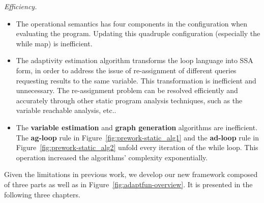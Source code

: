  \emph{Efficiency.}
 \begin{itemize}
    \item The operational semantics has four components in the configuration when evaluating the program. 
    Updating this quadruple configuration (especially the while map) is inefficient.   
    \item
    The adaptivity estimation algorithm transforms the loop language into SSA form, in order to address the issue of re-assignment of different queries requesting results to the same variable.
    This transformation is inefficient and unnecessary.
    The re-assignment problem can be resolved efficiently and accurately through other static program analysis techniques, such as the
    variable reachable analysis, etc..
    \item The \textbf{variable estimation} and \textbf{graph generation} algorithms are inefficient.
    The \textbf{ag-loop} rule in Figure~\ref{fig:prework-static_alg1}
   and the \textbf{ad-loop} rule in Figure~\ref{fig:prework-static_alg2}
   unfold every iteration of the while loop.
   This operation increased the algorithms' complexity exponentially. 
    \end{itemize}

Given the limitations in previous work, we develop our new framework
composed of three parts as well as in Figure~\ref{fig:adaptfun-overview}.
It is presented in the following three chapters.